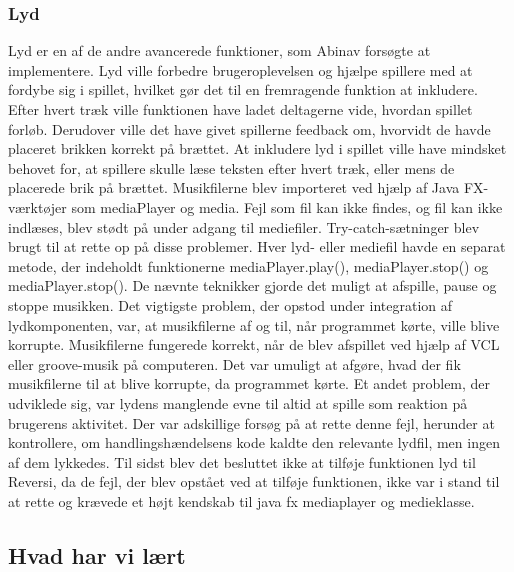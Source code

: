 \subsubsection{Lyd}\label{lyd}
Lyd er en af de andre avancerede funktioner, som Abinav forsøgte at implementere. Lyd ville forbedre brugeroplevelsen og hjælpe spillere med at fordybe sig i spillet, hvilket gør det til en fremragende funktion at inkludere. Efter hvert træk ville funktionen have ladet deltagerne vide, hvordan spillet forløb. Derudover ville det have givet spillerne feedback om, hvorvidt de havde placeret brikken korrekt på brættet. At inkludere lyd i spillet ville have mindsket behovet for, at spillere skulle læse teksten efter hvert træk, eller mens de placerede brik på brættet.
Musikfilerne blev importeret ved hjælp af Java FX-værktøjer som mediaPlayer og media. Fejl som fil kan ikke findes, og fil kan ikke indlæses, blev stødt på under adgang til mediefiler. Try-catch-sætninger blev brugt til at rette op på disse problemer. Hver lyd- eller mediefil havde en separat metode, der indeholdt funktionerne mediaPlayer.play(), mediaPlayer.stop() og mediaPlayer.stop(). De nævnte teknikker gjorde det muligt at afspille, pause og stoppe musikken. Det vigtigste problem, der opstod under integration af lydkomponenten, var, at musikfilerne af og til, når programmet kørte, ville blive korrupte. Musikfilerne fungerede korrekt, når de blev afspillet ved hjælp af VCL eller groove-musik på computeren. Det var umuligt at afgøre, hvad der fik musikfilerne til at blive korrupte, da programmet kørte. Et andet problem, der udviklede sig, var lydens manglende evne til altid at spille som reaktion på brugerens aktivitet. Der var adskillige forsøg på at rette denne fejl, herunder at kontrollere, om handlingshændelsens kode kaldte den relevante lydfil, men ingen af dem lykkedes. Til sidst blev det besluttet ikke at tilføje funktionen lyd til Reversi, da de fejl, der blev opstået ved at tilføje funktionen, ikke var i stand til at rette og krævede et højt kendskab til java fx mediaplayer og medieklasse.


\subsection{Hvad har vi lært}
